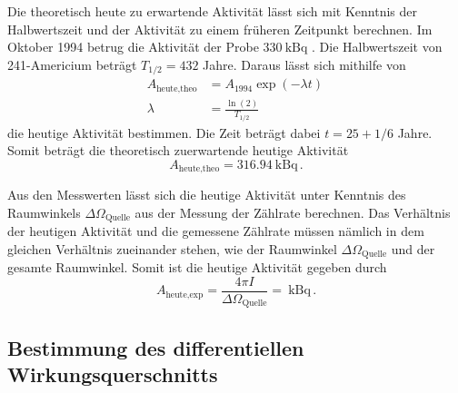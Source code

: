 Die theoretisch heute zu erwartende Aktivität lässt sich mit Kenntnis der Halbwertszeit
und der Aktivität zu einem früheren Zeitpunkt berechnen. Im Oktober 1994 betrug die
Aktivität der Probe $\SI{330}{\kilo\becquerel}$ \cite{Versuchsanleitung}. Die Halbwertszeit
von 241-Americium beträgt $T_{1/2}=432$ Jahre. Daraus lässt sich mithilfe von
\begin{align*}
  A_{\text{heute,theo}}&= A_{1994}\exp(-\lambda t) \, \\
  \lambda&= \frac{\ln(2)}{T_{1/2}}
\end{align*}
die heutige Aktivität bestimmen. Die Zeit beträgt dabei $t=25+1/6$ Jahre. Somit beträgt die
theoretisch zuerwartende heutige Aktivität
\begin{equation*}
  A_{\text{heute,theo}}= \SI{316.94}{\kilo\becquerel} \,.
\end{equation*}

Aus den Messwerten lässt sich die heutige Aktivität unter
Kenntnis des Raumwinkels $\Delta \Omega_{\text{Quelle}}$ aus der Messung der Zählrate berechnen.
Das Verhältnis der heutigen Aktivität und die gemessene Zählrate müssen nämlich in
dem gleichen Verhältnis zueinander stehen, wie der Raumwinkel $\Delta \Omega_{\text{Quelle}}$ und
der gesamte Raumwinkel. Somit ist die heutige Aktivität gegeben durch
\begin{equation*}
  A_{\text{heute,exp}}=\frac{4 \pi  I}{\Delta \Omega_{\text{Quelle}}}=\SI{}{\kilo\becquerel} \,.
\end{equation*}


\subsection{Bestimmung des differentiellen Wirkungsquerschnitts}
\label{subsec:wq}


